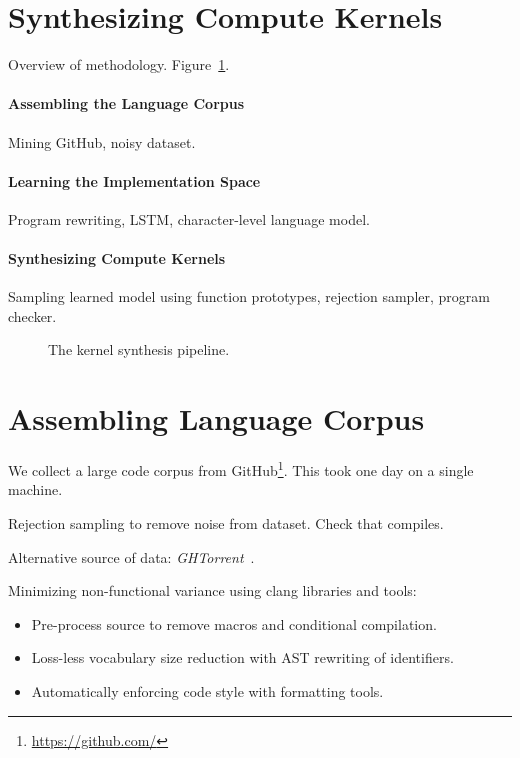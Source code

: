 \documentclass[preprint,nonatbib,10pt,nocopyrightspace]{sigplanconf}
\begin{document}
\section{Synthesizing Compute Kernels}\label{sec:}

Overview of methodology. Figure~\ref{fig:structure}.

\paragraph{Assembling the Language Corpus} Mining GitHub, noisy
dataset.


\paragraph{Learning the Implementation Space} Program rewriting, LSTM,
character-level language model.


\paragraph{Synthesizing Compute Kernels} Sampling learned model using
function prototypes, rejection sampler, program checker.


\begin{figure}%
  \centering
  
  \caption{%
    The kernel synthesis pipeline.%
  }
\label{fig:structure}
\end{figure}


\section{Assembling Language Corpus}\label{sec:}

We collect a large code corpus from
GitHub\footnote{\url{https://github.com/}}. This took one day on a
single machine.

Rejection sampling to remove noise from dataset. Check that compiles.

Alternative source of data: \emph{GHTorrent}~\cite{Gousios2014a}.

Minimizing non-functional variance using clang libraries and tools:
\begin{itemize}
\item Pre-process source to remove macros and conditional
  compilation.
\item Loss-less vocabulary size reduction with AST rewriting of
  identifiers.
\item Automatically enforcing code style with formatting tools.
\end{itemize}
\end{document}
